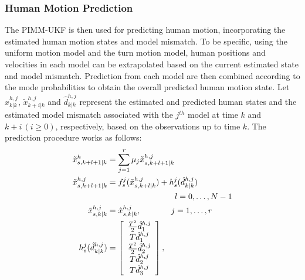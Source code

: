 \documentclass[journal]{IEEEtran}
\newcommand{\todoQ}[1]{\vspace{0px} %
	\todo[inline, color=orange!50]{\textbf{[Note:]} {#1}} %
}
\begin{document}
	\subsubsection{Human Motion Prediction}\label{subsec:motion_pred}
The PIMM-UKF is then used for predicting human motion, incorporating the estimated human motion states and model mismatch.
	To be specific, using the uniform motion model and the turn motion model, human positions and velocities in each model can be extrapolated based on the current estimated state and model mismatch.
    Prediction from each model are then combined according to the mode probabilities to obtain the overall predicted human motion state.
	Let $\hat{x}^{h,j}_{k|k}$, $\tilde{x}^{h,j}_{k+i|k}$ and $\hat{d}^{h,j}_{k|k}$ represent the estimated and predicted human states and the estimated model mismatch associated with the $j^{th}$ model at time $k$ and $k+i\,(i\ge 0)$, respectively, based on the observations up to time $k$.
	The prediction procedure works as follows:
	\begin{subequations}\label{eqn:motion_pred_imm}
		\begin{align}
			\tilde{x}_{s,k+l+1|k}^h&=\sum\limits_{j=1}^{r}\mu_j \tilde{x}_{s,k+l+1|k}^{h,j} \\
           \tilde{x}_{s,k+l+1|k}^{h,j}&=f_s^j(\tilde{x}_{s,k+l|k}^{h,j})+h_s^j(\hat{d}^{h,j}_{k|k})\\ \nonumber &\hspace{29mm}l=0,\dots,N-1 \\ 
                      \tilde{x}_{s,k|k}^{h,j}&=\hat{x}_{s,k|k}^{h,j}, ~~~~~~~~~~~j=1,\dots,r \\  \nonumber 
         h_s^j(\hat{d}^{h,j}_{k|k})&=\left[
			\begin{array}{c}
				\frac{T^2}{2}\hat{d}^{h,j}_1\\
				T\hat{d}^{h,j}_1\\
				\frac{T^2}{2}\hat{d}^{h,j}_2\\
				T\hat{d}^{h,j}_2\\
				T\hat{d}^{h,j}_3\\
			\end{array}\right], \nonumber 
		\end{align}
	\end{subequations} \normalsize            
\end{document}
